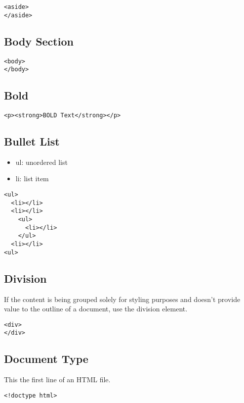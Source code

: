 \documentclass{article}
\begin{document}
\begin{lstlisting}
<aside>
</aside>
\end{lstlisting}

\subsection{Body Section}
\begin{lstlisting}
<body>
</body>
\end{lstlisting}

\subsection{Bold}
\begin{lstlisting}
<p><strong>BOLD Text</strong></p>
\end{lstlisting}

\subsection{Bullet List}
\begin{itemize}
  \item ul: unordered list
  \item li: list item
\end{itemize}

\begin{lstlisting}
<ul>
  <li></li>
  <li></li>
    <ul>
      <li></li>
    </ul>
  <li></li>
<ul>
\end{lstlisting}

\subsection{Division}
If the content is being grouped solely for styling purposes and doesn't provide
value to the outline of a document, use the division element.

\begin{lstlisting}
<div>
</div>
\end{lstlisting}

\subsection{Document Type}
This the first line of an HTML file.

\begin{lstlisting}
<!doctype html>
\end{lstlisting}
\end{document}

